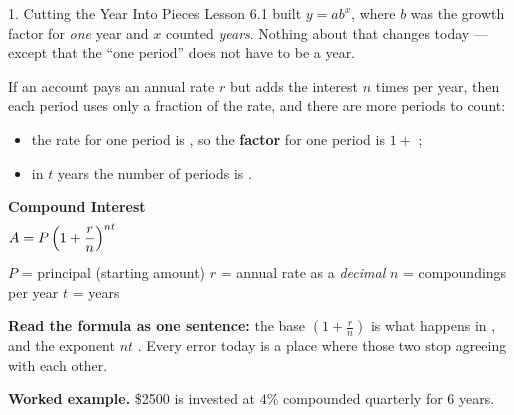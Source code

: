 \documentclass[10pt]{article}
\newcommand{\TallMath}[1]{$\displaystyle #1\rule[-1.4em]{0pt}{3.2em}$}
\begin{document}
\boxguard
\begin{notesbox}{1. Cutting the Year Into Pieces}
Lesson 6.1 built $y=ab^{x}$, where $b$ was the growth factor for \emph{one} year and $x$ counted
\emph{years}. Nothing about that changes today --- except that the ``one period'' does not have to be a
year.

\vspace{4pt}
If an account pays an annual rate $r$ but adds the interest $n$ times per year, then each period uses
only a fraction of the rate, and there are more periods to count:

\vspace{2pt}
\begin{itemize}[leftmargin=1.4em, itemsep=2pt]
  \item the rate for one period is \blank{1.6cm}, so the \textbf{factor} for one period is $1+$ \blank{1.6cm};
  \item in $t$ years the number of periods is \blank{1.6cm}.
\end{itemize}

\vspace{4pt}
\begin{center}
\begin{tcolorbox}[colback=goldbg, colframe=goldacc, boxrule=0.8pt, arc=1.5mm, width=0.92\linewidth,
    left=3mm, right=3mm, top=2mm, bottom=2mm]
\centering
\textbf{Compound Interest} \\[3pt]
\TallMath{A = P\left(1+\frac{r}{n}\right)^{nt}}
\\[1pt]
{\small $P$ = principal (starting amount) \quad $r$ = annual rate as a \emph{decimal} \quad
$n$ = compoundings per year \quad $t$ = years}
\end{tcolorbox}
\end{center}

\vspace{2pt}
\textbf{Read the formula as one sentence:} the base $\left(1+\frac{r}{n}\right)$ is what happens in
\blank{3.6cm}, and the exponent $nt$ \blank{3.6cm}. Every error today is a place where those two stop
agreeing with each other.

\vspace{5pt}
\textbf{Worked example.} \$2500 is invested at $4\%$ compounded quarterly for $6$ years.


\end{notesbox}
\end{document}
